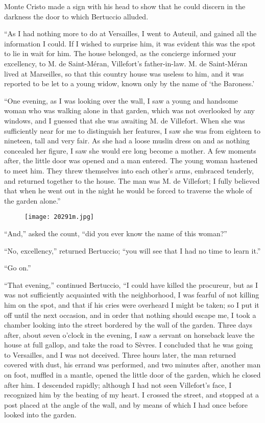 Monte Cristo made a sign with his head to show that he could discern in
the darkness the door to which Bertuccio alluded.

“As I had nothing more to do at Versailles, I went to Auteuil, and
gained all the information I could. If I wished to surprise him, it was
evident this was the spot to lie in wait for him. The house belonged,
as the concierge informed your excellency, to M. de Saint-Méran,
Villefort’s father-in-law. M. de Saint-Méran lived at Marseilles, so
that this country house was useless to him, and it was reported to be
let to a young widow, known only by the name of ‘the Baroness.’

“One evening, as I was looking over the wall, I saw a young and
handsome woman who was walking alone in that garden, which was not
overlooked by any windows, and I guessed that she was awaiting M. de
Villefort. When she was sufficiently near for me to distinguish her
features, I saw she was from eighteen to nineteen, tall and very fair.
As she had a loose muslin dress on and as nothing concealed her figure,
I saw she would ere long become a mother. A few moments after, the
little door was opened and a man entered. The young woman hastened to
meet him. They threw themselves into each other’s arms, embraced
tenderly, and returned together to the house. The man was M. de
Villefort; I fully believed that when he went out in the night he would
be forced to traverse the whole of the garden alone.”

\begin{figure}[h]
\texttt{[image: 20291m.jpg]}
\end{figure}

“And,” asked the count, “did you ever know the name of this woman?”

“No, excellency,” returned Bertuccio; “you will see that I had no time
to learn it.”

“Go on.”

“That evening,” continued Bertuccio, “I could have killed the
procureur, but as I was not sufficiently acquainted with the
neighborhood, I was fearful of not killing him on the spot, and that if
his cries were overheard I might be taken; so I put it off until the
next occasion, and in order that nothing should escape me, I took a
chamber looking into the street bordered by the wall of the garden.
Three days after, about seven o’clock in the evening, I saw a servant
on horseback leave the house at full gallop, and take the road to
Sèvres. I concluded that he was going to Versailles, and I was not
deceived. Three hours later, the man returned covered with dust, his
errand was performed, and two minutes after, another man on foot,
muffled in a mantle, opened the little door of the garden, which he
closed after him. I descended rapidly; although I had not seen
Villefort’s face, I recognized him by the beating of my heart. I
crossed the street, and stopped at a post placed at the angle of the
wall, and by means of which I had once before looked into the garden.

